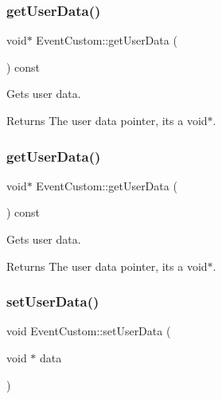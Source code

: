 \subsubsection{\texorpdfstring{get\+User\+Data()}{getUserData()}\hspace{0.1cm}{\footnotesize\ttfamily [1/2]}}
{\footnotesize\ttfamily void$\ast$ Event\+Custom\+::get\+User\+Data (\begin{DoxyParamCaption}{ }\end{DoxyParamCaption}) const\hspace{0.3cm}{\ttfamily [inline]}}

Gets user data.

\begin{DoxyReturn}{Returns}
The user data pointer, it\textquotesingle{}s a void$\ast$. 
\end{DoxyReturn}
\mbox{\label{classEventCustom_a529d67c97ccfc46cff7a18878fd396f9}} 
\subsubsection{\texorpdfstring{get\+User\+Data()}{getUserData()}\hspace{0.1cm}{\footnotesize\ttfamily [2/2]}}
{\footnotesize\ttfamily void$\ast$ Event\+Custom\+::get\+User\+Data (\begin{DoxyParamCaption}{ }\end{DoxyParamCaption}) const\hspace{0.3cm}{\ttfamily [inline]}}

Gets user data.

\begin{DoxyReturn}{Returns}
The user data pointer, it\textquotesingle{}s a void$\ast$. 
\end{DoxyReturn}
\mbox{\label{classEventCustom_a63403ffc75d834cc39e405e7aa47aa3a}} 
\subsubsection{\texorpdfstring{set\+User\+Data()}{setUserData()}\hspace{0.1cm}{\footnotesize\ttfamily [1/2]}}
{\footnotesize\ttfamily void Event\+Custom\+::set\+User\+Data (\begin{DoxyParamCaption}\item[{void $\ast$}]{data }\end{DoxyParamCaption})\hspace{0.3cm}{\ttfamily [inline]}}

